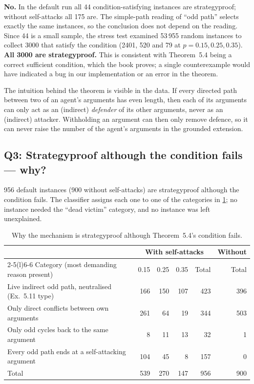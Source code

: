 \documentclass[11pt,a4paper]{article}
\theoremstyle{definition}
\begin{document}
\textbf{No.} In the default run all 44 condition-satisfying instances are strategyproof; without
self-attacks all 175 are. The simple-path reading of ``odd path'' selects exactly the same instances,
so the conclusion does not depend on the reading. Since 44 is a small sample, the stress test
examined 53\,955 random instances to collect 3000 that satisfy the condition (2401, 520 and 79 at
$p=0.15,0.25,0.35$). \textbf{All 3000 are strategyproof.} This is consistent with Theorem~5.4 being a
correct sufficient condition, which the book proves; a single counterexample would have indicated a
bug in our implementation or an error in the theorem.

The intuition behind the theorem is visible in the data. If every directed path between two of an
agent's arguments has even length, then each of its arguments can only act as an (indirect)
\emph{defender} of its other arguments, never as an (indirect) attacker. Withholding an argument can
then only remove defence, so it can never raise the number of the agent's arguments in the grounded
extension.

\subsection*{Q3: Strategyproof although the condition fails --- why?}

956 default instances (900 without self-attacks) are strategyproof although the condition fails. The
classifier assigns each one to one of the categories in \cref{tab:q3}; no instance needed the
``dead victim'' category, and no instance was left unexplained.

\begin{table}[H]
\centering\small
\begin{tabularx}{\textwidth}{@{}X r r r r r@{}}
\toprule
& \multicolumn{4}{c}{With self-attacks} & Without \\
\cmidrule(lr){2-5}\cmidrule(l){6-6}
Category (most demanding reason present) & 0.15 & 0.25 & 0.35 & Total & Total \\
\midrule
Live indirect odd path, neutralised (Ex.~5.11 type) & 166 & 150 & 107 & 423 & 396 \\
Only direct conflicts between own arguments & 261 & 64 & 19 & 344 & 503 \\
Only odd cycles back to the same argument & 8 & 11 & 13 & 32 & 1 \\
Every odd path ends at a self-attacking argument & 104 & 45 & 8 & 157 & 0 \\
\midrule
Total & 539 & 270 & 147 & 956 & 900 \\
\bottomrule
\end{tabularx}
\caption{Why the mechanism is strategyproof although Theorem~5.4's condition fails.}\label{tab:q3}
\end{table}
\end{document}
